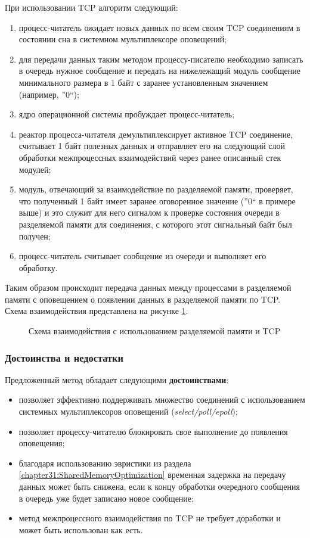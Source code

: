 При использовании TCP алгоритм следующий:
\begin{enumerate}
\item процесс-читатель ожидает новых данных по всем своим TCP соединениям в состоянии сна в системном мультиплексоре оповещений;
\item для передачи данных таким методом процессу-писателю необходимо записать в очередь нужное сообщение и передать на нижележащий модуль сообщение минимального размера в 1 байт с заранее установленным значением (например, ''0``);
\item ядро операционной системы пробуждает процесс-читатель;
\item реактор процесса-читателя демультиплексирует активное TCP соединение, считывает 1 байт полезных данных и отправляет его на следующий слой обработки межпроцессных взаимодействий через ранее описанный стек модулей;
\item модуль, отвечающий за взаимодействие по разделяемой памяти, проверяет, что полученный 1 байт имеет заранее оговоренное значение (''0`` в примере выше) и это служит для него сигналом к проверке состояния очереди в разделяемой памяти для соединения, с которого этот сигнальный байт был получен;
\item процесс-читатель считывает сообщение из очереди и выполняет его обработку.
\end{enumerate}

Таким образом происходит передача данных между процессами в разделяемой памяти с оповещением о появлении данных в разделяемой памяти по TCP. Схема взаимодействия представлена на рисунке \ref{chapter31:TCPShmemStack}.

\begin{figure}[!h]
\caption{Схема взаимодействия с использованием разделяемой памяти и TCP}
\label{chapter31:TCPShmemStack}
\end{figure}

\subsubsection{Достоинства и недостатки}

Предложенный метод обладает следующими \textbf{достоинствами}:
\begin{itemize}
\item позволяет эффективно поддерживать множество соединений с использованием системных мультиплексоров оповещений (\textit{select/poll/epoll});
\item позволяет процессу-читателю блокировать свое выполнение до появления оповещения;
\item благодаря использованию эвристики из раздела \ref{chapter31:SharedMemoryOptimization} временная задержка на передачу данных может быть снижена, если к концу обработки очередного сообщения в очередь уже будет записано новое сообщение;
\item метод межпроцессного взаимодействия по TCP не требует доработки и может быть использован как есть.
\end{itemize}

